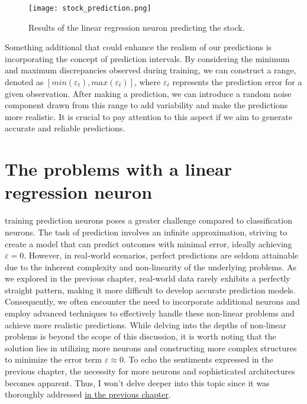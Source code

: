 \begin{figure}[H]
  \centering
  \texttt{[image: stock\_prediction.png]}
  \caption{Results of the linear regression neuron predicting the stock.}
\end{figure}

Something additional that could enhance the realism of our predictions is incorporating the concept of
prediction intervals. By considering the minimum and maximum discrepancies observed during training, we can
construct a range, denoted as $[min(\varepsilon_t), max(\varepsilon_t)]$, where $\varepsilon_t$ represents the
prediction error for a given observation. After making a prediction, we can introduce a random noise component
drawn from this range to add variability and make the predictions more realistic. It is crucial to pay
attention to this aspect if we aim to generate accurate and reliable predictions.

\section{The problems with a linear regression neuron}
 training prediction neurons poses a greater challenge compared
to classification neurons. The task of prediction involves an infinite approximation, striving to create a
model that can predict outcomes with minimal error, ideally achieving $\varepsilon = 0$. However, in
real-world
scenarios, perfect predictions are seldom attainable due to the inherent complexity and non-linearity of the
underlying problems. As we explored in the previous chapter, real-world data rarely exhibits a perfectly
straight pattern, making it more difficult to develop accurate prediction models. Consequently, we often
encounter the need to incorporate additional neurons and employ advanced techniques to effectively handle
these non-linear problems and achieve more realistic predictions. While delving into the depths of non-linear
problems is beyond the scope of this discussion, it is worth noting that the solution lies in utilizing more
neurons and constructing more complex structures to minimize the error term $\varepsilon \approx 0$. To echo the
sentiments expressed in the previous chapter, the necessity for more neurons and sophisticated architectures
becomes apparent. Thus, I won't delve deeper into this topic since it was thoroughly addressed
\hyperref[sec:problems-with-the-perceptron]{in the
previous chapter}.
